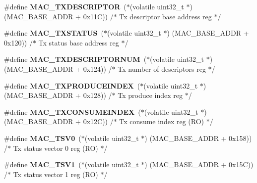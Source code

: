 \begin{DoxyCompactItemize}
\item 
\mbox{\label{group__lpc24xx__regs_gab2146d57230ee0847c7b0fca82c29d4b}} 
\#define {\bfseries M\+A\+C\+\_\+\+T\+X\+D\+E\+S\+C\+R\+I\+P\+T\+OR}~($\ast$(volatile uint32\+\_\+t $\ast$) (M\+A\+C\+\_\+\+B\+A\+S\+E\+\_\+\+A\+D\+DR + 0x11\+C)) /$\ast$ Tx descriptor base address reg $\ast$/
\item 
\mbox{\label{group__lpc24xx__regs_ga2a2cab341d9bce8427b3c7cf6ea648e0}} 
\#define {\bfseries M\+A\+C\+\_\+\+T\+X\+S\+T\+A\+T\+US}~($\ast$(volatile uint32\+\_\+t $\ast$) (M\+A\+C\+\_\+\+B\+A\+S\+E\+\_\+\+A\+D\+DR + 0x120)) /$\ast$ Tx status base address reg $\ast$/
\item 
\mbox{\label{group__lpc24xx__regs_gad10276bd30e8431e7034ea6ad517e55c}} 
\#define {\bfseries M\+A\+C\+\_\+\+T\+X\+D\+E\+S\+C\+R\+I\+P\+T\+O\+R\+N\+UM}~($\ast$(volatile uint32\+\_\+t $\ast$) (M\+A\+C\+\_\+\+B\+A\+S\+E\+\_\+\+A\+D\+DR + 0x124)) /$\ast$ Tx number of descriptors reg $\ast$/
\item 
\mbox{\label{group__lpc24xx__regs_ga44cfb603f50fbf1ddb2d0f9254ad2fe5}} 
\#define {\bfseries M\+A\+C\+\_\+\+T\+X\+P\+R\+O\+D\+U\+C\+E\+I\+N\+D\+EX}~($\ast$(volatile uint32\+\_\+t $\ast$) (M\+A\+C\+\_\+\+B\+A\+S\+E\+\_\+\+A\+D\+DR + 0x128)) /$\ast$ Tx produce index reg $\ast$/
\item 
\mbox{\label{group__lpc24xx__regs_ga97618bf0a2545f9f6ac5b43ac1ee5f04}} 
\#define {\bfseries M\+A\+C\+\_\+\+T\+X\+C\+O\+N\+S\+U\+M\+E\+I\+N\+D\+EX}~($\ast$(volatile uint32\+\_\+t $\ast$) (M\+A\+C\+\_\+\+B\+A\+S\+E\+\_\+\+A\+D\+DR + 0x12\+C)) /$\ast$ Tx consume index reg (\+R\+O) $\ast$/
\item 
\mbox{\label{group__lpc24xx__regs_ga9ced14d5dc63ca6c1903ed333a327c44}} 
\#define {\bfseries M\+A\+C\+\_\+\+T\+S\+V0}~($\ast$(volatile uint32\+\_\+t $\ast$) (M\+A\+C\+\_\+\+B\+A\+S\+E\+\_\+\+A\+D\+DR + 0x158)) /$\ast$ Tx status vector 0 reg (\+R\+O) $\ast$/
\item 
\mbox{\label{group__lpc24xx__regs_ga644ab6784b3347e1713263f0723eb826}} 
\#define {\bfseries M\+A\+C\+\_\+\+T\+S\+V1}~($\ast$(volatile uint32\+\_\+t $\ast$) (M\+A\+C\+\_\+\+B\+A\+S\+E\+\_\+\+A\+D\+DR + 0x15\+C)) /$\ast$ Tx status vector 1 reg (\+R\+O) $\ast$/

\end{DoxyCompactItemize}
